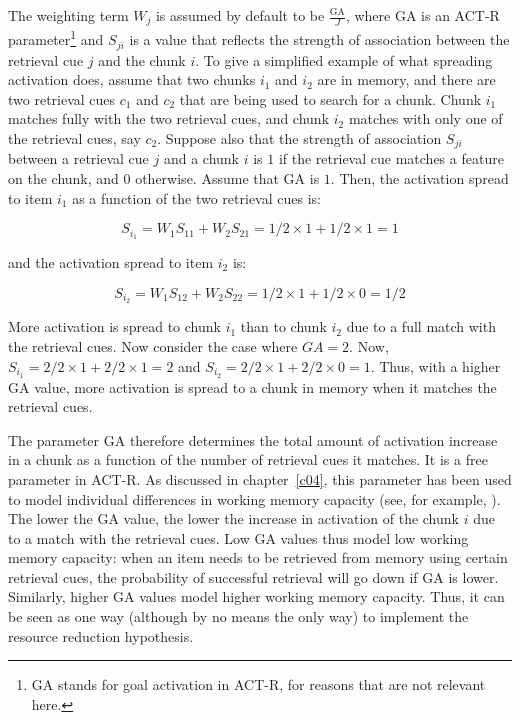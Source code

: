 \documentclass{cambridge7A}\usepackage[]{graphicx}\usepackage[]{color}
\begin{document}
\noindent
The weighting term $W_j$ is assumed by default to be $\frac{\text{GA}}{J}$, where GA is an ACT-R parameter\footnote{GA stands for goal activation in ACT-R, for reasons that are not relevant here.} and $S_{ji}$ is a value that  reflects the strength of association between  the retrieval cue $j$ and the chunk $i$. To give a simplified  example of what spreading activation does, assume that two chunks $i_1$ and $i_2$ are in memory, and there are two retrieval cues $c_1$ and $c_2$ that are being used to search for a chunk. Chunk $i_1$ matches fully with the two retrieval cues, and chunk $i_2$ matches with only one of the retrieval cues, say $c_2$.  Suppose also that the strength of association $S_{ji}$ between a retrieval cue $j$ and a chunk $i$ is $1$ if the retrieval cue matches a feature on the chunk, and $0$ otherwise. Assume that GA is $1$.
Then, the activation spread to item $i_1$ as a function of the two retrieval cues is: 

\begin{equation}
  S_{i_1} = W_1 S_{11}+W_2 S_{21}=1/2 \times 1 + 1/2 \times 1 = 1
\end{equation}

and the activation spread to item $i_2$ is:

\begin{equation}
  S_{i_2} = W_1 S_{12}+W_2 S_{22}=1/2 \times 1 + 1/2 \times 0 = 1/2
\end{equation}

More activation is spread to chunk $i_1$ than to chunk $i_2$ due to a full match with the retrieval cues. Now consider the case where $GA=2$. Now, 
$S_{i_1}= 2/2 \times 1 + 2/2 \times 1 = 2$ and 
$S_{i_2}= 2/2 \times 1 + 2/2 \times 0 = 1$. Thus, with a higher GA value, more activation is spread to a chunk in memory when it matches the retrieval cues.

The parameter GA therefore determines the total amount of activation increase in a chunk as a function of the number of retrieval cues it matches. It is a free parameter in ACT-R. As discussed in chapter~\ref{c04}, this parameter 
has been used to model individual differences in working memory capacity (see, for example, \cite{DailyEtAl2001}). 
The lower the GA value, the lower the increase in activation of the chunk $i$ due to a match with the retrieval cues.
Low GA values thus model low working memory capacity: when an item needs to be retrieved from memory using certain retrieval cues, the probability of successful retrieval will go down if GA is lower.
Similarly, higher GA values model higher working memory capacity.
Thus, it can be seen as one way (although by no means the only way) to implement the resource reduction hypothesis. 
\end{document}
